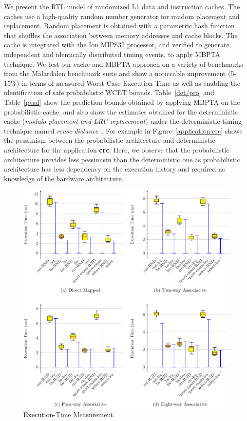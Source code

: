 We present the RTL model of randomized L1 data and
instruction caches. The caches use a high-quality random number
generator for random placement and replacement. Random placement is
obtained with a parametric hash function that shuffles the association
between memory addresses and cache blocks. The cache is integrated
with the Ion MIPS32 processor, and verified to generate independent
and identically distributed timing events, to apply MBPTA technique. 
We test our cache
and MBPTA approach on a variety of benchmarks from the M\"alardalen
benchmark suite and show a noticeable improvement (5-15\%) in terms of
measured Worst Case Execution Time as well as enabling the
identification of safe probabilistic WCET bounds. Table~\ref{det/pro} and Table~\ref{pvsd} show the prediction bounds obtained by applying MBPTA on the probabilistic cache, and  also show the estimates obtained for the deterministic cache (\textit{modulo placement and LRU replacement}) under the  deterministic timing technique named \textit{reuse-distance}~\cite{beyls2001reuse}. For example in Figure~\ref{application:crc} shows the pessimism between the probabilistic architecture and deterministic architecture for the application \textbf{crc}. Here, we observe that the probabilistic architecture provides less pessimism than the deterministic one as probabilistic architecture has less dependency on the execution history and required no knowledge of the hardware architecture.





\begin{figure}[tb!]
   \includegraphics[scale=1.1]{figures/img/boxplot.pdf}
   \caption{Execution-Time Measurement.}
\label{fig:boxplot}
\end{figure}



